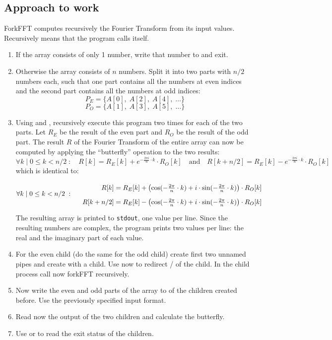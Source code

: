 \subsection*{Approach to work}
ForkFFT computes recursively the Fourier Transform from its input values. Recursively means that the program calls itself. 
\begin{enumerate}
\item If the array consists of only 1 number, write that number to  and exit.
\item Otherwise the array consists of $n$ numbers.
Split it into two parts with $n/2$ numbers each,
such that one part contains all the numbers at even indices
and the second part contains all the numbers at odd indices:
\[
P_E=\{A[0],\;A[2],\;A[4],\;\dots\}
\]
\[
P_O=\{A[1],\;A[3],\;A[5],\;\dots\}
\]
\item Using  and ,
recursively execute this program two times for each of the two parts.
Let $R_E$ be the result of the even part and $R_O$ be the result of the odd part.
The result $R$ of the Fourier Transform of the entire array can now be computed
by applying the ``butterfly'' operation to the two results:
\[
\forall k\;|\;0\leq k<n/2\;:\quad R[k]=R_E[k]+e^{-\frac{2\pi i}{n}\cdot k}\cdot R_O[k]
\quad\text{and}\quad R[k+n/2]=R_E[k]-e^{-\frac{2\pi i}{n}\cdot k}\cdot R_O[k]
\]
which is identical to:
\[
\forall k\;|\;0\leq k<n/2\;:\quad
\renewcommand{\arraystretch}{1.8}
\begin{array}{r@{\;=\;}l}
 R[k]     & R_E[k]+\left(\text{cos}(-\frac{2\pi}{n}\cdot k)+i\cdot\text{sin}(-\frac{2\pi}{n}\cdot k)\right)\cdot R_O[k]\\
R[k+n/2] & R_E[k]-\left(\text{cos}(-\frac{2\pi}{n}\cdot k)+i\cdot\text{sin}(-\frac{2\pi}{n}\cdot k)\right)\cdot R_O[k]
\end{array}
\]
The resulting array is printed to \texttt{stdout}, one value per line.
Since the resulting numbers are complex, the program prints two values per line:
the real and the imaginary part of each value.

\item For the even child (do the same for the odd child) create first two unnamed pipes and create with  a child. Use now  to redirect / of the child. In the child process call now forkFFT recursively.
\item Now write the even and odd parts of the array to  of the children created before. Use the previously specified input format.
\item Read now the output of the two children and calculate the butterfly. 
\item Use  or  to read the exit status of the children.

\end{enumerate}

